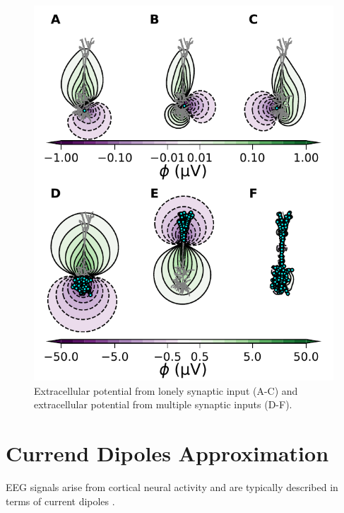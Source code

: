 \documentclass[a4paper, UKenglish, 11pt]{uiomaster}
\begin{document}
\begin{figure}[H]
    \centering
    \includegraphics[width=\linewidth]{figures/fig_chosen_dipoles.pdf}
    \caption{Extracellular potential from lonely synaptic input (A-C) and extracellular potential from multiple synaptic inputs (D-F).}
    \label{fig:EP}
\end{figure}


\section{Currend Dipoles Approximation}
EEG signals arise from cortical neural activity and are typically described in terms of current dipoles \cite{95}.
\end{document}
